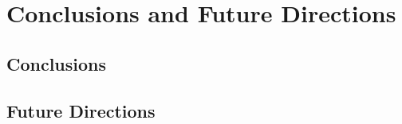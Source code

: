 \section{Conclusions and Future Directions}
\label{sec:conclude}

\subsection{Conclusions}

\subsection{Future Directions}
